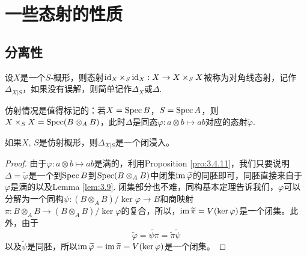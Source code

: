 
\chapter{一些态射的性质}

\section{分离性}

\begin{para}[对角线]
	设$X$是一个$S$-概形，则态射$\operatorname{id}_X\times_S\operatorname{id}_X:X\to X\times_S X$被称为对角线态射，记作$\Delta_{X|S}$，如果没有误解，则简单记作$\Delta_X$或$\Delta$.
\end{para}

仿射情况是值得标记的：若$X=\operatorname{Spec} B$，$S=\operatorname{Spec} A$，则$X\times_S X=\operatorname{Spec} (B\otimes_A B)$，此时$\Delta$是同态$\varphi:a\otimes b\mapsto ab$对应的态射$\widetilde{\varphi}$.

\begin{lem}\label{lem:4.1.2}
	如果$X$, $S$是仿射概形，则$\Delta_{X|S}$是一个闭浸入。
\end{lem}

\begin{proof}
由于$\varphi:a\otimes b\mapsto ab$是满的，利用Proposition \ref{pro:3.4.11}，我们只要说明$\Delta=\widetilde{\varphi}$是一个到$\operatorname{Spec} B$到$\operatorname{Spec} (B\otimes_A B)$中闭集$\operatorname{im} \widetilde{\varphi}$的同胚即可，同胚直接来自于$\varphi$是满的以及Lemma \ref{lem:3.9}. 闭集部分也不难，同构基本定理告诉我们，$\varphi$可以分解为一个同构$\psi:(B\otimes_A B)/\ker \varphi\to B$和商映射$\pi:B\otimes_A B\to (B\otimes_A B)/\ker \varphi$的复合，所以，$\operatorname{im} \widetilde{\pi}=V(\ker \varphi)$是一个闭集。此外，由于
\[
	\widetilde{\varphi}=\widetilde{\psi\pi}=\widetilde{\pi}\widetilde{\psi}
\]
以及$\widetilde{\psi}$是同胚，所以$\operatorname{im} \widetilde{\varphi}=\operatorname{im} \widetilde{\pi}=V(\ker \varphi)$是一个闭集。
\end{proof}

